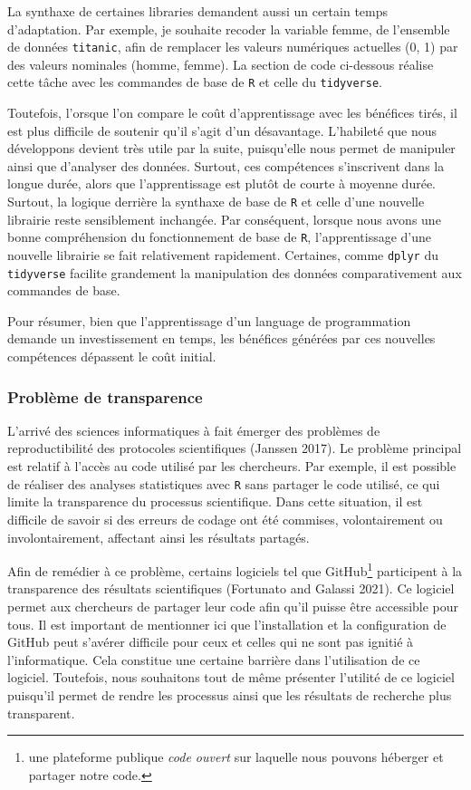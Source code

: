 \documentclass[
  letterpaper,
]{scrbook}
\begin{document}
La synthaxe de certaines libraries demandent aussi un certain temps
d'adaptation. Par exemple, je souhaite recoder la variable femme, de
l'ensemble de données \texttt{titanic}, afin de remplacer les valeurs
numériques actuelles (0, 1) par des valeurs nominales (homme, femme). La
section de code ci-dessous réalise cette tâche avec les commandes de
base de \texttt{R} et celle du \texttt{tidyverse}.

Toutefois, l'orsque l'on compare le coût d'apprentissage avec les
bénéfices tirés, il est plus difficile de soutenir qu'il s'agit d'un
désavantage. L'habileté que nous développons devient très utile par la
suite, puisqu'elle nous permet de manipuler ainsi que d'analyser des
données. Surtout, ces compétences s'inscrivent dans la longue durée,
alors que l'apprentissage est plutôt de courte à moyenne durée. Surtout,
la logique derrière la synthaxe de base de \texttt{R} et celle d'une
nouvelle librairie reste sensiblement inchangée. Par conséquent, lorsque
nous avons une bonne compréhension du fonctionnement de base de
\texttt{R}, l'apprentissage d'une nouvelle librairie se fait
relativement rapidement. Certaines, comme \texttt{dplyr} du
\texttt{tidyverse} facilite grandement la manipulation des données
comparativement aux commandes de base.

Pour résumer, bien que l'apprentissage d'un language de programmation
demande un investissement en temps, les bénéfices générées par ces
nouvelles compétences dépassent le coût initial.

\hypertarget{probluxe8me-de-transparence}{%
\subsubsection{Problème de
transparence}\label{probluxe8me-de-transparence}}

L'arrivé des sciences informatiques à fait émerger des problèmes de
reproductibilité des protocoles scientifiques (Janssen 2017). Le
problème principal est relatif à l'accès au code utilisé par les
chercheurs. Par exemple, il est possible de réaliser des analyses
statistiques avec \texttt{R} sans partager le code utilisé, ce qui
limite la transparence du processus scientifique. Dans cette situation,
il est difficile de savoir si des erreurs de codage ont été commises,
volontairement ou involontairement, affectant ainsi les résultats
partagés.

Afin de remédier à ce problème, certains logiciels tel que
GitHub\footnote{une plateforme publique \emph{code ouvert} sur laquelle
  nous pouvons héberger et partager notre code.} participent à la
transparence des résultats scientifiques (Fortunato and Galassi 2021).
Ce logiciel permet aux chercheurs de partager leur code afin qu'il
puisse être accessible pour tous. Il est important de mentionner ici que
l'installation et la configuration de GitHub peut s'avérer difficile
pour ceux et celles qui ne sont pas ignitié à l'informatique. Cela
constitue une certaine barrière dans l'utilisation de ce logiciel.
Toutefois, nous souhaitons tout de même présenter l'utilité de ce
logiciel puisqu'il permet de rendre les processus ainsi que les
résultats de recherche plus transparent.
\end{document}
